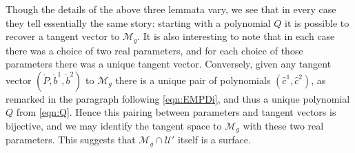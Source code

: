 \documentclass{article}
\begin{document}
Though the details of the above three lemmata vary, we see that in every case they tell essentially the same story: starting with a polynomial $Q$ it is possible to recover a tangent vector to $\mathcal{M}_g$. It is also interesting to note that in each case there was a choice of two real parameters, and for each choice of those parameters there was a unique tangent vector. Conversely, given any tangent vector $(\dot P, \dot{b}^1, \dot{b}^2)$ to $\mathcal{M}_g$ there is a unique pair of polynomials $(\hat{c}^1,\hat{c}^2)$, as remarked in the paragraph following \eqref{eqn:EMPDi}, and thus a unique polynomial $Q$ from \eqref{eqn:Q}. Hence this pairing between parameters and tangent vectors is bijective, and we may identify the tangent space to $\mathcal{M}_g$ with these two real parameters. This suggests that $\mathcal{M}_g \cap \mathcal{U}'$ itself is a surface.
\end{document}
